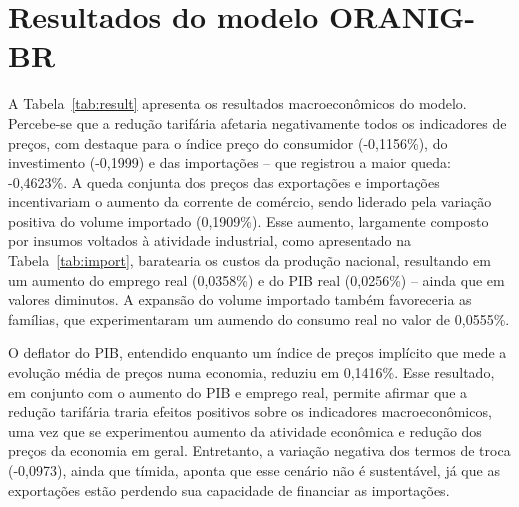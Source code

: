 \section{Resultados do modelo ORANIG-BR} \label{sec:resultados}

A Tabela~\ref{tab:result} apresenta os resultados macroeconômicos do modelo. Percebe-se que a redução tarifária afetaria negativamente todos os indicadores de preços, com destaque para o índice preço do consumidor (-0,1156\%), do investimento (-0,1999) e das importações -- que registrou a maior queda: -0,4623\%. A queda conjunta dos preços das exportações e importações incentivariam o aumento da corrente de comércio, sendo liderado pela variação positiva do volume importado (0,1909\%). Esse aumento, largamente composto por insumos voltados à atividade industrial, como apresentado na Tabela~\ref{tab:import}, baratearia os custos da produção nacional, resultando em um aumento do emprego real (0,0358\%) e do PIB real (0,0256\%) -- ainda que em valores diminutos. A expansão do volume importado também favoreceria as famílias, que experimentaram um aumendo do consumo real no valor de 0,0555\%.

O deflator do PIB, entendido enquanto um índice de preços implícito que mede a evolução média de preços numa economia, reduziu em 0,1416\%. Esse resultado, em conjunto com o aumento do PIB e emprego real, permite afirmar que a redução tarifária traria efeitos positivos sobre os indicadores macroeconômicos, uma vez que se experimentou aumento da atividade econômica e redução dos preços da economia em geral. Entretanto, a variação negativa dos termos de troca (-0,0973), ainda que tímida, aponta que esse cenário não é sustentável, já que as exportações estão perdendo sua capacidade de financiar as importações. 


